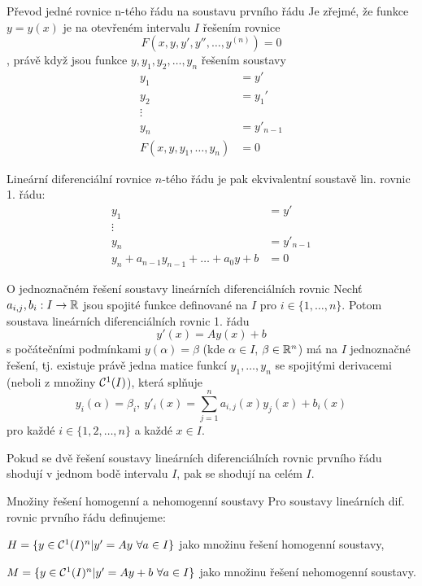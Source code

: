\begin{poznamkaN}{Převod jedné rovnice n-tého řádu na soustavu prvního řádu}
Je zřejmé, že funkce $y=y(x)$ je na otevřeném intervalu $I$ řešením rovnice $$F(x,y,y',y'',\dots,y^{(n)})=0$$, právě když jsou funkce $y,y_1,y_2,\dots,y_n$ řešením soustavy
\begin{align*}
y_1 &= y'\\
y_2 &= y_1'\\
\vdots\\
y_n &= y'_{n-1}\\
F(x,y,y_1,\dots,y_n)&=0
\end{align*}
\par\noindent
Lineární diferenciální rovnice $n$-tého řádu je pak ekvivalentní soustavě lin. rovnic 1. řádu:
\begin{align*}
y_1 &= y'\\
\vdots\\
y_n &= y'_{n-1}\\
y_n+a_{n-1}y_{n-1}+\dots+a_0y+b&=0
\end{align*}
\end{poznamkaN}


\begin{vetaN}{O jednoznačném řešení soustavy lineárních diferenciálních rovnic}
Nechť $a_{i,j},b_i:I\to\mathbb{R}$ jsou spojité funkce definované na $I$ pro $i\in\{1,\dots,n\}$. Potom soustava lineárních diferenciálních rovnic 1. řádu 
$$y'(x)=Ay(x)+b$$
s počátečními podmínkami $y(\alpha)=\beta$ (kde $\alpha\in I$, $\beta\in\mathbb{R}^{n}$) má na $I$ jednoznačné řešení, tj. existuje právě jedna matice funkcí $y_1,\dots,y_n$ se spojitými derivacemi (neboli z množiny $\mathcal{C}^1(I)$), která splňuje
$$y_i(\alpha)=\beta_i,\ y'_i(x)=\sum_{j=1}^n a_{i,j}(x)y_j(x) + b_i(x)$$
pro každé $i\in\{1,2,\dots,n\}$ a každé $x\in I$.
\end{vetaN}

\begin{dusledek}
Pokud se dvě řešení soustavy lineárních diferenciálních rovnic prvního řádu shodují v jednom bodě intervalu $I$, pak se shodují na celém $I$.
\end{dusledek}

\begin{definiceN}{Množiny řešení homogenní a nehomogenní soustavy}
Pro soustavy lineárních dif. rovnic prvního řádu definujeme:
\begin{pitemize}
    \item $H=\{y\in\mathcal{C}^1(I)^n | y'=Ay\ \forall a\in I\} $ jako množinu řešení homogenní soustavy,
    \item $M=\{y\in\mathcal{C}^1(I)^n | y'=Ay+b\ \forall a\in I\} $ jako množinu řešení nehomogenní soustavy.
\end{pitemize} 
\end{definiceN}


